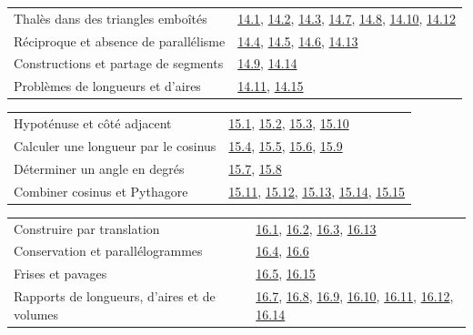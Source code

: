 \begin{tabularx}{\linewidth}{@{}Yl@{}}\toprule
Thalès dans des triangles emboîtés & \hyperref[exo-14-1]{14.1}, \hyperref[exo-14-2]{14.2}, \hyperref[exo-14-3]{14.3}, \hyperref[exo-14-7]{14.7}, \hyperref[exo-14-8]{14.8}, \hyperref[exo-14-10]{14.10}, \hyperref[exo-14-12]{14.12}\\[2mm]
Réciproque et absence de parallélisme & \hyperref[exo-14-4]{14.4}, \hyperref[exo-14-5]{14.5}, \hyperref[exo-14-6]{14.6}, \hyperref[exo-14-13]{14.13}\\[2mm]
Constructions et partage de segments & \hyperref[exo-14-9]{14.9}, \hyperref[exo-14-14]{14.14}\\[2mm]
Problèmes de longueurs et d’aires & \hyperref[exo-14-11]{14.11}, \hyperref[exo-14-15]{14.15}\\[2mm]
\bottomrule\end{tabularx}\par\vspace{4mm}
\begin{tabularx}{\linewidth}{@{}Yl@{}}\toprule
Hypoténuse et côté adjacent & \hyperref[exo-15-1]{15.1}, \hyperref[exo-15-2]{15.2}, \hyperref[exo-15-3]{15.3}, \hyperref[exo-15-10]{15.10}\\[2mm]
Calculer une longueur par le cosinus & \hyperref[exo-15-4]{15.4}, \hyperref[exo-15-5]{15.5}, \hyperref[exo-15-6]{15.6}, \hyperref[exo-15-9]{15.9}\\[2mm]
Déterminer un angle en degrés & \hyperref[exo-15-7]{15.7}, \hyperref[exo-15-8]{15.8}\\[2mm]
Combiner cosinus et Pythagore & \hyperref[exo-15-11]{15.11}, \hyperref[exo-15-12]{15.12}, \hyperref[exo-15-13]{15.13}, \hyperref[exo-15-14]{15.14}, \hyperref[exo-15-15]{15.15}\\[2mm]
\bottomrule\end{tabularx}\par\vspace{4mm}
\clearpage
{}\fontsize{10}{13}\selectfont
{}\begin{tabularx}{\linewidth}{@{}Yl@{}}\toprule
Construire par translation & \hyperref[exo-16-1]{16.1}, \hyperref[exo-16-2]{16.2}, \hyperref[exo-16-3]{16.3}, \hyperref[exo-16-13]{16.13}\\[2mm]
Conservation et parallélogrammes & \hyperref[exo-16-4]{16.4}, \hyperref[exo-16-6]{16.6}\\[2mm]
Frises et pavages & \hyperref[exo-16-5]{16.5}, \hyperref[exo-16-15]{16.15}\\[2mm]
Rapports de longueurs, d’aires et de volumes & \hyperref[exo-16-7]{16.7}, \hyperref[exo-16-8]{16.8}, \hyperref[exo-16-9]{16.9}, \hyperref[exo-16-10]{16.10}, \hyperref[exo-16-11]{16.11}, \hyperref[exo-16-12]{16.12}, \hyperref[exo-16-14]{16.14}\\[2mm]
\bottomrule\end{tabularx}\par\vspace{4mm}
